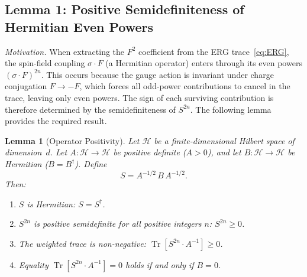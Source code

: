 \documentclass[12pt,a4paper]{article}
\theoremstyle{plain}
\newtheorem{lemma}[theorem]{Lemma}
\theoremstyle{definition}
\theoremstyle{remark}
\begin{document}
\subsection{Lemma 1: Positive Semidefiniteness of Hermitian Even Powers}\label{sec:lemma1}

\textit{Motivation.} When extracting the $F^2$ coefficient from the ERG trace~\eqref{eq:ERG}, the spin-field coupling $\sigma\cdot F$ (a Hermitian operator) enters through its even powers $(\sigma\cdot F)^{2n}$. This occurs because the gauge action is invariant under charge conjugation $F\to-F$, which forces all odd-power contributions to cancel in the trace, leaving only even powers. The sign of each surviving contribution is therefore determined by the semidefiniteness of $S^{2n}$. The following lemma provides the required result.

\begin{lemma}[Operator Positivity]\label{lem:op}
Let $\mathcal{H}$ be a finite-dimensional Hilbert space of dimension~$d$. Let $A:\mathcal{H}\to\mathcal{H}$ be positive definite ($A>0$), and let $B:\mathcal{H}\to\mathcal{H}$ be Hermitian ($B=B^\dagger$). Define
\begin{equation}\label{eq:Sdef}
S = A^{-1/2}\,B\,A^{-1/2}.
\end{equation}
Then:
\begin{enumerate}[label=(\alph*)]
\item $S$ is Hermitian: $S=S^\dagger$.
\item $S^{2n}$ is positive semidefinite for all positive integers $n$: $S^{2n}\geq 0$.
\item The weighted trace is non-negative: $\operatorname{Tr}[S^{2n}\cdot A^{-1}]\geq 0$.
\item Equality $\operatorname{Tr}[S^{2n}\cdot A^{-1}]=0$ holds if and only if $B=0$.
\end{enumerate}
\end{lemma}
\end{document}
